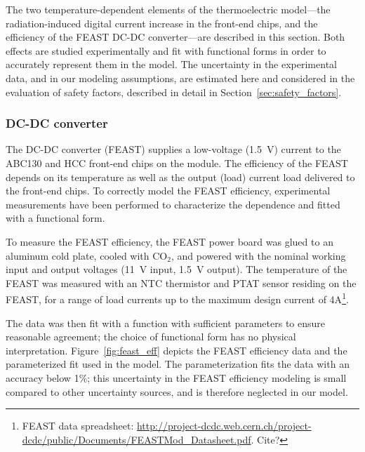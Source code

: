 
The two temperature-dependent elements of the thermoelectric model---the
radiation-induced digital current increase in the front-end chips, and the
efficiency of the FEAST DC-DC converter---are described in this section.
Both effects are studied experimentally and fit with functional forms
in order to accurately represent them in the model.
The uncertainty in the experimental data, and in our modeling assumptions,
are estimated here and considered in the evaluation of safety factors,
described in detail in Section~\ref{sec:safety_factors}.

\subsubsection{DC-DC converter}

The DC-DC converter (FEAST) supplies a low-voltage (1.5~V) current to the ABC130 and HCC front-end
chips on the module.
The efficiency of the FEAST depends on its temperature as well as the output (load) current
load delivered to the front-end chips. To correctly model the FEAST efficiency, experimental
measurements have been performed to characterize the dependence and fitted with a functional form.

To measure the FEAST efficiency, the FEAST power board was glued to an aluminum cold plate, cooled
with CO$_2$, and powered with the nominal working input and output voltages (11~V input, 1.5~V output).
The temperature of the FEAST was measured with an NTC thermistor and PTAT sensor residing on the FEAST,
for a range of load currents up to the maximum design current of 4A\footnote
{
FEAST data spreadsheet: \url{http://project-dcdc.web.cern.ch/project-dcdc/public/Documents/FEASTMod_Datasheet.pdf}.
Cite?
}.

The data was then fit with a function with sufficient parameters to ensure reasonable agreement; the
choice of functional form has no physical interpretation. Figure~\ref{fig:feast_eff} depicts the
FEAST efficiency data and the parameterized fit used in the model. The parameterization fits the data
with an accuracy below 1\%; this uncertainty in the FEAST efficiency modeling is small
compared to other uncertainty sources, and is therefore neglected in our model.

